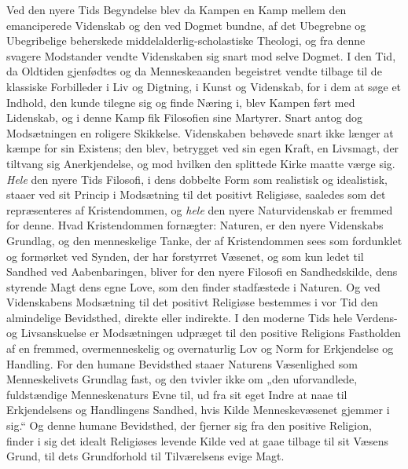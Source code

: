 \documentclass[12pt,a4paper,openany]{book}
\newcommand{\opage}[1]{\marginnote{\footnotesize\textit{[#1]}}}
\begin{document}
Ved den nyere Tids Begyndelse blev da Kampen en
Kamp mellem den emanciperede Videnskab og den ved
Dogmet bundne, af det Ubegrebne og Ubegribelige beherskede
middelalderlig-scholastiske Theologi, og fra denne svagere
Modstander vendte Videnskaben sig snart mod selve Dogmet.
I den Tid, da Oldtiden gjenfødtes og da Menneskeaanden
begeistret vendte tilbage til de klassiske Forbilleder i Liv og
Digtning, i Kunst og Videnskab, for i dem at søge et Indhold,
den kunde tilegne sig og finde Næring i, blev Kampen
ført med Lidenskab, og i denne Kamp fik Filosofien sine
Martyrer. Snart antog dog Modsætningen en roligere
Skikkelse. Videnskaben behøvede snart ikke længer at kæmpe
for sin Existens; den blev, betrygget ved sin egen Kraft, en
Livsmagt, der tiltvang sig Anerkjendelse, og mod hvilken
den splittede Kirke maatte værge sig. \emph{Hele} den nyere Tids
Filosofi, i dens dobbelte Form som realistisk og idealistisk,
staaer ved sit Princip i Modsætning til det positivt Religiøse,
saaledes som det repræsenteres af Kristendommen, og
\emph{hele} den nyere Naturvidenskab er fremmed for denne. Hvad
Kristendommen fornægter: Naturen, er den nyere Videnskabs
Grundlag, og den menneskelige Tanke, der af Kristendommen
sees som fordunklet og formørket ved Synden, der har forstyrret
Væsenet, og som kun ledet til Sandhed ved Aabenbaringen,
bliver for den nyere Filosofi en Sandhedskilde,
dens styrende Magt dens egne Love, som den finder stadfæstede
i Naturen. Og ved Videnskabens Modsætning til
\opage{293}det positivt Religiøse bestemmes i vor Tid den almindelige
Bevidsthed, direkte eller indirekte. I den moderne Tids
hele Verdens- og Livsanskuelse er Modsætningen udpræget
til den positive Religions Fastholden af en fremmed, overmenneskelig
og overnaturlig Lov og Norm for Erkjendelse
og Handling. For den humane Bevidsthed staaer Naturens
Væsenlighed som Menneskelivets Grundlag fast, og den
tvivler ikke om „den uforvandlede, fuldstændige Menneskenaturs
Evne til, ud fra sit eget Indre at naae til Erkjendelsens
og Handlingens Sandhed, hvis Kilde Menneskevæsenet
gjemmer i sig.“ Og denne humane Bevidsthed, der fjerner
sig fra den positive Religion, finder i sig det idealt Religiøses
levende Kilde ved at gaae tilbage til sit Væsens
Grund, til dets Grundforhold til Tilværelsens evige Magt.
\end{document}
